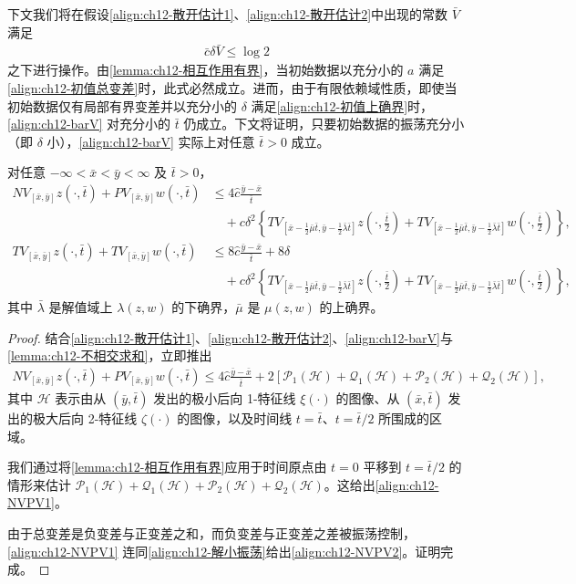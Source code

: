 \documentclass[../../main.tex]{subfiles}
\begin{document}
下文我们将在假设\eqref{align:ch12-散开估计1}、\eqref{align:ch12-散开估计2}中出现的常数 $\bar V$ 满足
\begin{align}
\bar c\delta\bar V\leqslant\log 2
\label{align:ch12-barV}
\end{align}
之下进行操作。由\cref{lemma:ch12-相互作用有界}，当初始数据以充分小的 $a$ 满足\eqref{align:ch12-初值总变差}时，此式必然成立。进而，由于有限依赖域性质，即使当初始数据仅有局部有界变差并以充分小的 $\delta$ 满足\eqref{align:ch12-初值上确界}时，\eqref{align:ch12-barV} 对充分小的 $\bar t$ 仍成立。下文将证明，只要初始数据的振荡充分小（即 $\delta$ 小），\eqref{align:ch12-barV} 实际上对任意 $\bar t>0$ 成立。

\begin{lemma}\label{lemma:ch12-NVPV}
对任意 $-\infty<\bar x<\bar y<\infty$ 及 $\bar t>0$，
\begin{align}
NV_{[\bar x,\bar y]}z(\cdot,\bar t)+PV_{[\bar x,\bar y]}w(\cdot,\bar t)&\leqslant 4\hat c\frac{\bar y-\bar x}{\bar t}\nonumber\\
&\quad+c\delta^2\left\{TV_{[\bar x-\frac12\bar\mu\bar t,\bar y-\frac12\bar\lambda\bar t]}z\left(\cdot,\frac{\bar t}{2}\right)+TV_{[\bar x-\frac12\bar\mu\bar t,\bar y-\frac12\bar\lambda\bar t]}w\left(\cdot,\frac{\bar t}{2}\right)\right\},
\label{align:ch12-NVPV1}\\
TV_{[\bar x,\bar y]}z(\cdot,\bar t)+TV_{[\bar x,\bar y]}w(\cdot,\bar t)&\leqslant 8\hat c\frac{\bar y-\bar x}{\bar t}+8\delta\nonumber\\
&\quad+c\delta^2\left\{TV_{[\bar x-\frac12\bar\mu\bar t,\bar y-\frac12\bar\lambda\bar t]}z\left(\cdot,\frac{\bar t}{2}\right)+TV_{[\bar x-\frac12\bar\mu\bar t,\bar y-\frac12\bar\lambda\bar t]}w\left(\cdot,\frac{\bar t}{2}\right)\right\},
\label{align:ch12-NVPV2}
\end{align}
其中 $\bar\lambda$ 是解值域上 $\lambda(z,w)$ 的下确界，$\bar\mu$ 是 $\mu(z,w)$ 的上确界。
\end{lemma}

\begin{proof}
结合\eqref{align:ch12-散开估计1}、\eqref{align:ch12-散开估计2}、\eqref{align:ch12-barV}与\cref{lemma:ch12-不相交求和}，立即推出
\begin{align}
NV_{[\bar x,\bar y]}z(\cdot,\bar t)+PV_{[\bar x,\bar y]}w(\cdot,\bar t)\leqslant 4\hat c\frac{\bar y-\bar x}{\bar t}+2[\mathscr{P}_1(\mathscr{H})+\mathscr{Q}_1(\mathscr{H})+\mathscr{P}_2(\mathscr{H})+\mathscr{Q}_2(\mathscr{H})],
\label{align:ch12-NVPV前}
\end{align}
其中 $\mathscr{H}$ 表示由从 $(\bar y,\bar t)$ 发出的极小后向 1-特征线 $\xi(\cdot)$ 的图像、从 $(\bar x,\bar t)$ 发出的极大后向 2-特征线 $\zeta(\cdot)$ 的图像，以及时间线 $t=\bar t$、$t=\bar t/2$ 所围成的区域。

我们通过将\cref{lemma:ch12-相互作用有界}应用于时间原点由 $t=0$ 平移到 $t=\bar t/2$ 的情形来估计 $\mathscr{P}_1(\mathscr{H})+\mathscr{Q}_1(\mathscr{H})+\mathscr{P}_2(\mathscr{H})+\mathscr{Q}_2(\mathscr{H})$。这给出\eqref{align:ch12-NVPV1}。

由于总变差是负变差与正变差之和，而负变差与正变差之差被振荡控制，\eqref{align:ch12-NVPV1} 连同\eqref{align:ch12-解小振荡}给出\eqref{align:ch12-NVPV2}。证明完成。
\end{proof}
\end{document}
